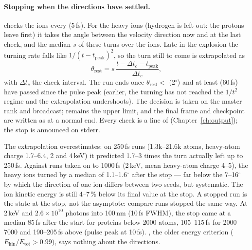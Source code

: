 \paragraph{Stopping when the directions have settled.}
 checks the ions every  (5\,fs).
For the heavy ions (hydrogen is left out: the protons leave first) it takes the angle between the velocity direction
now and at the last check, and the median $s$ of these turns over the ions.
Late in the explosion the turning rate falls like $1/(t-t_{\mathrm{peak}})^2$, so the turn still to come is
extrapolated as
\begin{equation}
  \theta_{\mathrm{rest}} = s\,\frac{t-\Delta t_c-t_{\mathrm{peak}}}{\Delta t_c},
\end{equation}
with $\Delta t_c$ the check interval.
The run ends once $\theta_{\mathrm{rest}}<$  (2$^\circ$) and at least
 (60\,fs) have passed since the pulse peak (earlier, the turning has not reached the
$1/t^2$ regime and the extrapolation undershoots).
The decision is taken on the master rank and broadcast;  remains the upper limit, and the final frame and
checkpoint are written as at a normal end.
Every check is a line of  (Chapter~\ref{ch:output}); the stop is announced on stderr.

The extrapolation overestimates: on 250\,fs runs (1.3k--21.6k atoms, heavy-atom charge 1.7--6.4, 2 and 4\,keV) it
predicted 1.7--3 times the turn actually left up to 250\,fs.
Against runs taken on to 1000\,fs (2\,keV, mean heavy-atom charge 4--5), the heavy ions turned by a median of
1.1--1.6$^\circ$ after the stop --- far below the 7--16$^\circ$ by which the direction of one ion differs between two
seeds, but systematic.
The ion kinetic energy is still 4--7\,\% below its final value at the stop.
A stopped run is the state at the stop, not the asymptote: compare runs stopped the same way.
At 2\,keV and $2.6\times10^{10}$ photons into 100\,nm (10\,fs FWHM), the stop came at a median 85\,fs after
the start for proteins below 2000 atoms, 105--115\,fs for 2000--7000 and 190--205\,fs above (pulse peak at 10\,fs).
, the older energy criterion ($E_{\mathrm{kin}}/E_{\mathrm{tot}}>0.99$), says nothing about the
directions.

